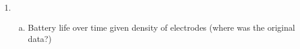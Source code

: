\documentclass[]{article}
\begin{document}
\begin{enumerate}
\item
\begin{enumerate}[(a)]
\item Battery life over time given density of electrodes (where was the original data?)

% 






\end{enumerate}
\end{enumerate}
\end{document}
